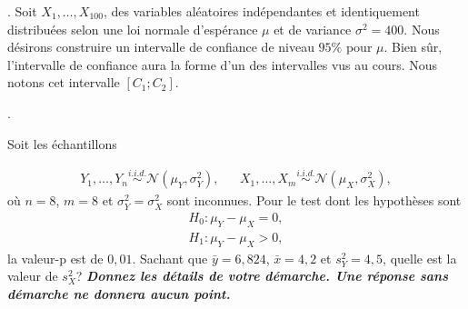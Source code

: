 \begin{questions}
\begin{parts}
\end{parts}
\newpage
.
\newpage
\question Soit $X_1,\hdots, X_{100}$, des variables aléatoires indépendantes et identiquement distribuées selon une loi normale d’espérance $\mu$ et de variance $\sigma^2 = 400$. 
Nous désirons construire un intervalle de confiance de niveau $95\%$ pour $\mu$. Bien sûr, l'intervalle de confiance aura la forme d'un des intervalles vus au cours. Nous notons cet intervalle $[C_1;C_2]$.


\newpage
.
\newpage

\question[10]
Soit les échantillons

\begin{align*}
Y_{1}, \ldots, Y_{n} \overset{i.i.d.}{\sim} \mathcal{N}(\mu_Y, \sigma^2_Y), & & X_{1}, \ldots, X_{m} \overset{i.i.d.}{\sim} \mathcal{N}(\mu_X, \sigma^2_X),
\end{align*}
où $n=8$, $m=8$ et $\sigma^2_Y=\sigma^2_X$ sont inconnues. Pour le test dont les hypothèses sont 
\begin{align*}
    H_0: \mu_Y-\mu_X=0,\\
    H_1: \mu_Y-\mu_X>0,
\end{align*}
 la valeur-p est de $0,01$. Sachant que $\bar{y}=6,824$, $\bar{x}=4,2$ et $s^2_Y=4,5$, quelle est la valeur de $s^2_X$? \textbf{\textit{Donnez les détails de votre démarche. Une réponse sans démarche ne donnera aucun point.}}


\end{questions}
